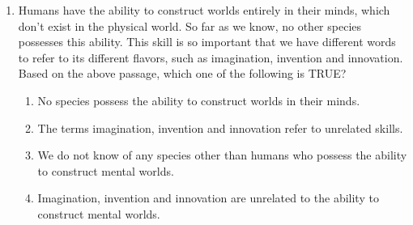 \documentclass[journal,12pt,onecolumn]{article}
\theoremstyle{remark}
\begin{document}
\begin{enumerate}
\item Humans have the ability to construct worlds entirely in their minds, which don't exist in the physical world. So far as we know, no other species possesses this ability. This skill is so important that we have different words to refer to its different flavors, such as imagination, invention and innovation.
Based on the above passage, which one of the following is TRUE?

\hfill{}
\begin{enumerate}
    \item No species possess the ability to construct worlds in their minds.
    \item The terms imagination, invention and innovation refer to unrelated skills.
    \item We do not know of any species other than humans who possess the ability to construct mental worlds.
    \item Imagination, invention and innovation are unrelated to the ability to construct mental worlds.
\end{enumerate}
\end{enumerate}
\end{document}
